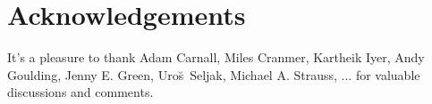 \documentclass[12pt, letterpaper, preprint, comicneue]{aastex63}
\begin{document}








\section*{Acknowledgements}
It's a pleasure to thank 
    Adam Carnall, 
    Miles Cranmer, 
    Kartheik Iyer,
    Andy Goulding,
    Jenny E. Green,
    Uro{\u s}~Seljak,
    Michael A. Strauss, 
    ...
for valuable discussions and comments.

\appendix

%
 
\end{document}
